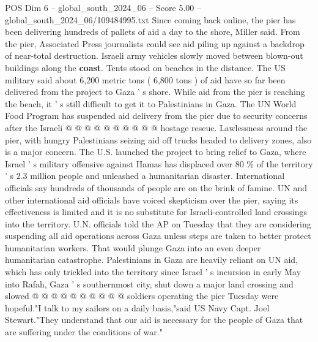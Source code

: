 \begin{textsample}{POS Dim 6 – global\_south\_2024\_06 – Score 5.00 – global\_south\_2024\_06/109484995.txt}
Since coming back online, the pier has been delivering hundreds of pallets of aid a day to the shore, Miller said.
From the pier, Associated Press journalists could see aid piling up against a backdrop of near-total destruction.
Israeli army vehicles slowly moved between blown-out buildings along the \textbf{coast}.
Tents stood on beaches in the distance.
The US military said about 6,200 metric tons ( 6,800 tons ) of aid have so far been delivered from the project to Gaza ' s shore.
While aid from the pier is reaching the beach, it ' s still difficult to get it to Palestinians in Gaza.
The UN World Food Program has suspended aid delivery from the pier due to security concerns after the Israeli @ @ @ @ @ @ @ @ @ @ hostage rescue.
Lawlessness around the pier, with hungry Palestinians seizing aid off trucks headed to delivery zones, also is a major concern.
The U.S. launched the project to bring relief to Gaza, where Israel ' s military offensive against Hamas has displaced over 80 \% of the territory ' s 2.3 million people and unleashed a humanitarian disaster.
International officials say hundreds of thousands of people are on the brink of famine.
UN and other international aid officials have voiced skepticism over the pier, saying its effectiveness is limited and it is no substitute for Israeli-controlled land crossings into the territory.
U.N. officials told the AP on Tuesday that they are considering suspending all aid operations across Gaza unless steps are taken to better protect humanitarian workers.
That would plunge Gaza into an even deeper humanitarian catastrophe.
Palestinians in Gaza are heavily reliant on UN aid, which has only trickled into the territory since Israel ' s incursion in early May into Rafah, Gaza ' s southernmost city, shut down a major land crossing and slowed @ @ @ @ @ @ @ @ @ @ soldiers operating the pier Tuesday were hopeful."I talk to my sailors on a daily basis,"said US Navy Capt.
Joel Stewart."They understand that our aid is necessary for the people of Gaza that are suffering under the conditions of war."

\end{textsample}
